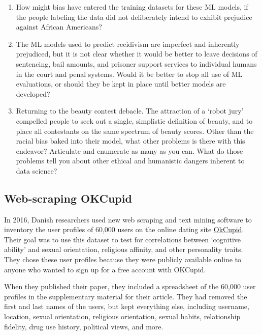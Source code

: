 \documentclass[]{book}
\begin{document}
\begin{enumerate}
\def\labelenumi{\arabic{enumi}.}
\item
  How might bias have entered the training datasets for these ML models, if the people labeling the data did not deliberately intend to exhibit prejudice against African Americans?
\item
  The ML models used to predict recidivism are imperfect and inherently prejudiced, but it is not clear whether it would be better to leave decisions of sentencing, bail amounts, and prisoner support services to individual humans in the court and penal systems. Would it be better to stop all use of ML evaluations, or should they be kept in place until better models are developed?
\item
  Returning to the beauty contest debacle. The attraction of a `robot jury' compelled people to seek out a single, simplistic definition of beauty, and to place all contestants on the same spectrum of beauty scores. Other than the racial bias baked into their model, what other problems is there with this endeavor? Articulate and enumerate as many as you can. What do those problems tell you about other ethical and humanistic dangers inherent to data science?
\end{enumerate}

\hypertarget{web-scraping-okcupid}{%
\subsection*{Web-scraping OKCupid}\label{web-scraping-okcupid}}

In 2016, Danish researchers used new web scraping and text mining software to inventory the user profiles of 60,000 users on the online dating site \href{https://fortune.com/2016/05/18/okcupid-data-research/}{OkCupid}. Their goal was to use this dataset to test for correlations between `cognitive ability' and sexual orientation, religious affinity, and other personality traits. They chose these user profiles because they were publicly available online to anyone who wanted to sign up for a free account with OKCupid.

When they published their paper, they included a spreadsheet of the 60,000 user profiles in the supplementary material for their article. They had removed the first and last names of the users, but kept everything else, including username, location, sexual orientation, religious orientation, sexual habits, relationship fidelity, drug use history, political views, and more.
\end{document}
